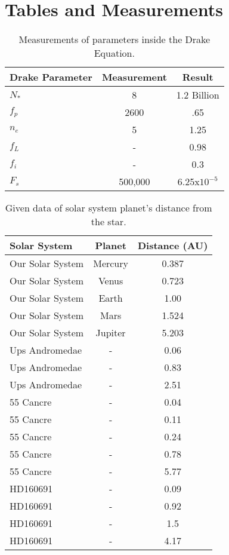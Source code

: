 \documentclass{article}
\begin{document}
\vspace{30 mm}


\section{Tables and Measurements}
\label{sec:tnm}

\begin{table}[h]
\begin{center}
\begin{tabular}{l c c}
\hline
Drake Parameter & Measurement & Result\\
\hline
\hline
${N}_{*}$ & 8 & 1.2 Billion\\
${f}_{p}$ & 2600 & .65\\ 
${n}_{e}$ & 5 & 1.25\\
${f}_{L}$ & - & 0.98\\
${f}_{i}$ & - & 0.3\\
${F}_{s}$ & 500,000 & 6.25x${10}^{-5}$\\
\hline
\end{tabular}
\end{center}
\caption{Measurements of parameters inside the Drake Equation.\label{tab:drake}}
\end{table}

\begin{table}[h!]
\begin{center}
\begin{tabular}{l c c}
\hline
Solar System & Planet & Distance (AU)\\
\hline
\hline
Our Solar System & Mercury & 0.387\\
Our Solar System & Venus & 0.723\\
Our Solar System & Earth & 1.00\\
Our Solar System & Mars & 1.524\\
Our Solar System & Jupiter & 5.203\\
Ups Andromedae & - & 0.06\\
Ups Andromedae & - & 0.83\\
Ups Andromedae & - & 2.51\\
55 Cancre & - &  0.04\\
55 Cancre & - &  0.11\\
55 Cancre & - &  0.24\\
55 Cancre & - &  0.78\\
55 Cancre & - &  5.77\\
HD160691 & - &  0.09\\
HD160691 & - &  0.92\\
HD160691 & - &  1.5\\
HD160691 & - &  4.17\\
\hline
\end{tabular}
\end{center}
\caption{Given data of solar system planet's distance from the star.\label{tab:planets}}
\end{table}
\end{document}
